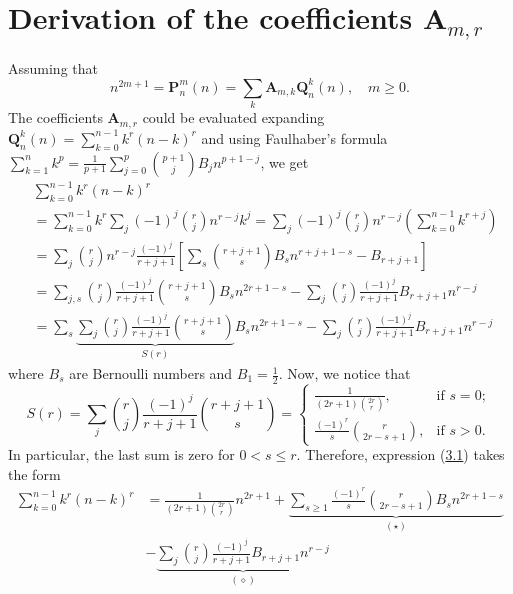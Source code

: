 \documentclass[12pt, letterpaper]{amsart}
\theoremstyle{definition}
\theoremstyle{remark}
\numberwithin{equation}{section}
\begin{document}
\section{Derivation of the coefficients \texorpdfstring{$\mathbf{A}_{m,r}$}{A(m,r)}}
Assuming that
\begin{equation*}
n^{2m+1} = \mathbf{P}^{m}_{n}(n) = \sum\limits_{k}\mathbf{A}_{m,k}\mathbf{Q}^{k}_{n}(n), \quad m\geq 0.
\end{equation*}
The coefficients $\mathbf{A}_{m,r}$ could be evaluated expanding $\mathbf{Q}^{k}_{n}(n)=\sum_{k=0}^{n-1}k^r(n-k)^r$ and using Faulhaber's formula $\sum _{k=1}^{n}k^{p}=\tfrac{1}{p+1}\sum _{j=0}^{p}{p+1 \choose j}B_{j}n^{p+1-j}$, we get
\begin{equation}\label{proof1}
\begin{split}
&\sum_{k=0}^{n-1}k^r(n-k)^r\\
&=\sum_{k=0}^{n-1} k^r \sum_{j} (-1)^j\binom{r}{j} n^{r-j}k^{j}=\sum_{j} (-1)^j\binom{r}{j} n^{r-j}\left(\sum_{k=0}^{n-1}k^{r+j}\right)\\
&=\sum_{j} \binom{r}{j} n^{r-j}\frac{(-1)^j}{r+j+1}\left[\sum_{s}\binom{r+j+1}{s}B_{s}n^{r+j+1-s}-B_{r+j+1}\right]\\
&=\sum_{j,s}\binom{r}{j}\frac{(-1)^j}{r+j+1}\binom{r+j+1}{s}B_{s}n^{2r+1-s}-\sum_{j} \binom{r}{j}\frac{(-1)^j}{r+j+1}B_{r+j+1}n^{r-j}\\
&=\sum_{s}\underbrace{\sum_{j}\binom{r}{j}\frac{(-1)^j}{r+j+1}\binom{r+j+1}{s}}_{S(r)}B_{s}n^{2r+1-s}-\sum_{j} \binom{r}{j}\frac{(-1)^j}{r+j+1}B_{r+j+1}n^{r-j}
\end{split}
\end{equation}
where $B_s$ are Bernoulli numbers and $B_1=\tfrac12$.
Now, we notice that
\begin{equation*}
S(r)=\sum_{j} \binom{r}{j}\frac{(-1)^j}{r+j+1}\binom{r+j+1}{s}
=\begin{cases}
\frac{1}{(2r+1)\binom{2r}r}, & \text{if } s=0;\\
\frac{(-1)^r}{s}\binom{r}{2r-s+1}, & \text{if } s>0.
\end{cases}
\end{equation*}
In particular, the last sum is zero for $0<s\leq r$. Therefore, expression (\hyperref[proof1]{3.1}) takes the form
\begin{equation*}
\begin{split}
\sum_{k=0}^{n-1}k^r(n-k)^r
&=\frac{1}{(2r+1)\binom{2r}r}n^{2r+1}+\underbrace{\sum_{s\geq 1}\frac{(-1)^r}{s}\binom{r}{2r-s+1}B_{s}n^{2r+1-s}}_{(\star)}\\
&-\underbrace{\sum_{j} \binom{r}{j}\frac{(-1)^j}{r+j+1}B_{r+j+1}n^{r-j}}_{(\diamond)}
\end{split}
\end{equation*}
\end{document}
